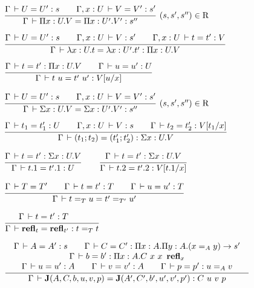 \documentclass[a4paper,english]{lipics-utf8x}
\begin{document}

  \begin{center}
  \(
    \rux{\Gamma \der U = U' : s \qquad
         \Gamma, x:U \der V = V' : s'
       }{\Gamma \der \Pi x:U.V = \Pi x:U'.V' : s''
       }{(s,s',s'') \in \R}
  \)
  \end{center}

  \begin{center}
  \(
    \ru{\Gamma \der U = U' : s \qquad
        \Gamma, x:U \der V : s' \qquad
        \Gamma, x:U \der t = t' : V
      }{\Gamma \der \lambda x:U.t = \lambda x:U'.t' : \Pi x:U.V}
  \)
  \end{center}

  \begin{center}
  \(
    \ru{\Gamma \der t = t' : \Pi x:U.V \qquad
        \Gamma \der u = u' : U
      }{\Gamma \der t~u = t'~u' : V[u/x]}
  \)
  \end{center}

  \begin{center}
  \(
    \rux{\Gamma \der U = U' : s \qquad
         \Gamma, x:U \der V = V' : s'
       }{\Gamma \der \Sigma x:U.V = \Sigma x:U'.V' : s''
       }{(s,s',s'') \in \R}
  \)
  \end{center}

  \begin{center}
  \(
    \ru{\Gamma \der t_1 = t'_1 : U \qquad
        \Gamma, x:U \der V : s \qquad
        \Gamma \der t_2 = t'_2 : V[t_1/x]
      }{\Gamma \der (t_1;t_2) = (t'_1;t'_2) : \Sigma x:U.V}
  \)
  \end{center}

  \begin{center}
  \(
    \ru{\Gamma \der t = t' : \Sigma x:U.V
      }{\Gamma \der t.1 = t'.1 : U}
    \qquad
    \ru{\Gamma \der t = t' : \Sigma x:U.V
      }{\Gamma \der t.2 = t'.2 : V[t.1/x]}
  \)
  \end{center}

  \begin{center}
  \(
    \ru{\Gamma \der T = T' \qquad
        \Gamma \der t = t' : T \qquad
        \Gamma \der u = u' : T
      }{\Gamma \der t =_T u = t' =_{T'} u'}
  \)
  \end{center}

  \begin{center}
  \(
    \ru{\Gamma \der t = t' : T \qquad
      }{\Gamma \der \refl_t = \refl_{t'} : t =_T t}
  \)
  \end{center}

  \begin{center}
  \(
    \tru{\Gamma \der A = A' : s \qquad
         \Gamma \der C = C' : \Pi x:A. \Pi y:A. (x =_A y) \to s'
       }{\Gamma \der b = b' : \Pi x:A. C\ x\ x\ \refl_x
       }{\Gamma \der u = u' : A \qquad
         \Gamma \der v = v' : A \qquad
         \Gamma \der p = p' : u =_A v
       }{\Gamma \der \J (A,C,b,u,v,p) = \J (A',C',b',u',v',p') : C\ u\ v\ p}
  \)
  \end{center}
\end{document}
